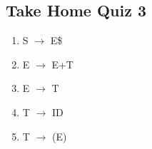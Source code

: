 \documentclass{report}
\begin{document}
\newpage
\subsection{Take Home Quiz 3 }
\vspace{-1.5em}
\begin{multicols}{2}
  \begin{enumerate}
    \setlength\itemsep{-.25em}
    \item S $\rightarrow$ E\$
    \item E $\rightarrow$ E+T
    \item E $\rightarrow$ T
    \item T $\rightarrow$ ID
    \item T $\rightarrow$ (E)
     \newline\newline\newline\newline\newline\newline\newline\newline\newline\newline\newline\newline\newline\newline\newline\newline\newline\newline\newline\newline\newline\newline
  \end{enumerate}
  \vspace{-50pt}
  \setlength{\leftskip}{-10em}

\end{multicols}
\end{document}
